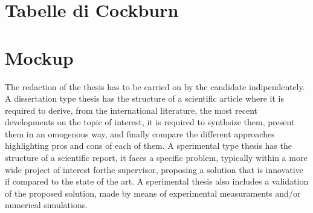 \section{Tabelle di Cockburn}



\pagebreak

\pagebreak






\pagebreak
\section{Mockup}

The redaction of the thesis has to be carried on by the candidate indipendentely. A dissertation type thesis has the structure of a scientific article where it is required to derive, from the international literature, the most recent developments on the topic of interest, it is required to synthsize them, present them in an omogenous way, and finally compare the different approaches highlighting pros and cons of each of them. A sperimental type thesis has the structure of a scientific report, it faces a specific problem, typically within a more wide project of interest forthe supervisor, proposing a solution that is innovative if compared to the state of the art. A sperimental thesis also includes a validation of the proposed solution, made by means of experimental measuraments and/or numerical simulations.

